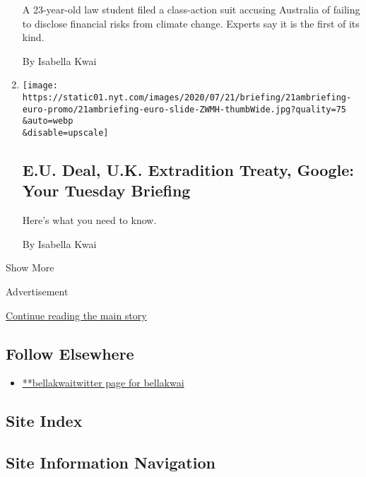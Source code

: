 \begin{enumerate}
  A 23-year-old law student filed a class-action suit accusing Australia
  of failing to disclose financial risks from climate change. Experts
  say it is the first of its kind.

  By Isabella Kwai
\item
  \href{/2020/07/21/briefing/eu-deal-uk-extradition-treaty-google.html}{}

  \texttt{[image: https://static01.nyt.com/images/2020/07/21/briefing/21ambriefing-euro-promo/21ambriefing-euro-slide-ZWMH-thumbWide.jpg?quality=75\\\&auto=webp\\\&disable=upscale]}

  \hypertarget{eu-deal-uk-extradition-treaty-google-your-tuesday-briefing}{%
  \subsection{E.U. Deal, U.K. Extradition Treaty, Google: Your Tuesday
  Briefing}\label{eu-deal-uk-extradition-treaty-google-your-tuesday-briefing}}

  Here's what you need to know.

  By Isabella Kwai
\end{enumerate}

Show More

Advertisement

\protect\hyperlink{after-mid2}{Continue reading the main story}

\hypertarget{follow-elsewhere}{%
\subsection{Follow Elsewhere}\label{follow-elsewhere}}

\begin{itemize}
\tightlist
\item
  \href{https://twitter.com/bellakwai}{**bellakwaitwitter page for
  bellakwai}
\end{itemize}

\hypertarget{site-index}{%
\subsection{Site Index}\label{site-index}}

\hypertarget{site-information-navigation}{%
\subsection{Site Information
Navigation}\label{site-information-navigation}}

